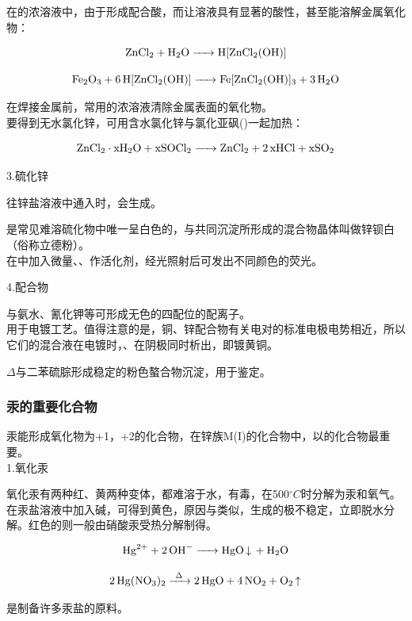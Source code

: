\documentclass[a4paper,UTF8]{article}
\begin{document}
在的浓溶液中，由于形成配合酸，而让溶液具有显著的酸性，甚至能溶解金属氧化物：

$$ \ce{ZnCl2 + H2O -> H[ZnCl2(OH)]} $$

$$ \ce{Fe2O3 + 6H[ZnCl2(OH)] -> Fe[ZnCl2(OH)]3 + 3H2O} $$

在焊接金属前，常用的浓溶液清除金属表面的氧化物。\\

要得到无水氯化锌，可用含水氯化锌与氯化亚砜()一起加热：

$$ \ce{ZnCl2\cdot xH2O + xSOCl2 -> ZnCl2 + 2xHCl + xSO2} $$

3.硫化锌

往锌盐溶液中通入时，会生成。

是常见难溶硫化物中唯一呈白色的，与共同沉淀所形成的混合物晶体叫做锌钡白（俗称立德粉）。\\

在中加入微量、、作活化剂，经光照射后可发出不同颜色的荧光。

4.配合物

与氨水、氰化钾等可形成无色的四配位的配离子。\\

用于电镀工艺。值得注意的是，铜、锌配合物有关电对的标准电极电势相近，所以它们的混合液在电镀时，、在阴极同时析出，即镀黄铜。

$\Delta$与二苯硫腙形成稳定的粉色螯合物沉淀，用于鉴定。

\subsubsection{汞的重要化合物}

汞能形成氧化物为+1，+2的化合物，在锌族M(I)的化合物中，以的化合物最重要。\\

1.氧化汞

氧化汞有两种红、黄两种变体，都难溶于水，有毒，在500$^\circ C$时分解为汞和氧气。在汞盐溶液中加入碱，可得到黄色，原因与类似，生成的极不稳定，立即脱水分解。红色的则一般由硝酸汞受热分解制得。

$$ \ce{Hg^{2+} + 2OH- -> HgO\ce{v} + H2O} $$

$$ \ce{2Hg(NO3)2 ->[\Delta] 2HgO + 4NO2 + O2\ce{^}} $$

是制备许多汞盐的原料。\\
\end{document}

